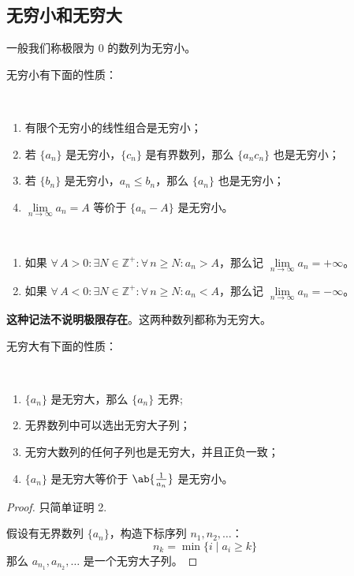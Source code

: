 \subsection{无穷小和无穷大}

\begin{definition}[无穷小]
	一般我们称极限为 $0$ 的数列为无穷小。
\end{definition}

无穷小有下面的性质：

\begin{property}[无穷小性质]
	\ 
	\begin{enumerate}
		\item 有限个无穷小的线性组合是无穷小；
		\item 若 $\{a_n\}$ 是无穷小，$\{c_n\}$ 是有界数列，那么 $\{a_n c_n\}$ 也是无穷小；
		\item 若 $\{b_n\}$ 是无穷小，$a_n \le b_n$，那么 $\{a_n\}$ 也是无穷小；
		\item $\lim\limits_{n \to \infty} a_n = A$ 等价于 $\{a_n - A\}$ 是无穷小。
	\end{enumerate}
\end{property}

\begin{definition}[无穷大]
	\ 
	\begin{enumerate}
		\item 如果 $\forall\,A > 0: \exists N \in \mathbb{Z}^+: \forall\,n \ge N: a_n > A$，那么记 $\lim\limits_{n \to \infty} a_n = +\infty$。
		\item 如果 $\forall\,A < 0: \exists N \in \mathbb{Z}^+: \forall\,n \ge N: a_n < A$，那么记 $\lim\limits_{n \to \infty} a_n = -\infty$。
	\end{enumerate}

	\textbf{这种记法不说明极限存在}。这两种数列都称为无穷大。
\end{definition}

无穷大有下面的性质：

\begin{property}[无穷大性质]
	\ 
	\begin{enumerate}
		\item $\{a_n\}$ 是无穷大，那么 $\{a_n\}$ 无界;
		\item 无界数列中可以选出无穷大子列；
		\item 无穷大数列的任何子列也是无穷大，并且正负一致；
		\item $\{a_n\}$ 是无穷大等价于 $\ab\{\frac{1}{a_n}\}$ 是无穷小。
	\end{enumerate}

	\begin{proof}
		只简单证明 2.

		假设有无界数列 $\{a_n\}$，构造下标序列 $n_1,n_2,\dots$：
		$$
		n_k = \min\{i \mid a_i \ge k\}
		$$
		那么 $a_{n_1},a_{n_2},\dots$ 是一个无穷大子列。
	\end{proof}
\end{property}


